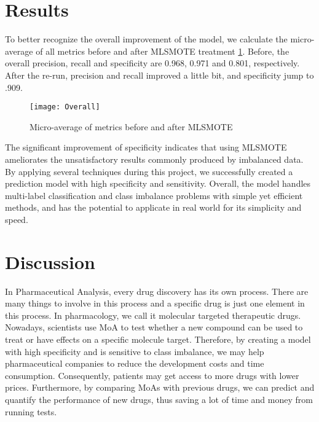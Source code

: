 \documentclass[11.5pt]{article}
\begin{document}
\section{Results}

To better recognize the overall improvement of the model, we calculate the micro-average of all metrics before and after MLSMOTE treatment \ref{fig:ave}. Before, the overall precision, recall and specificity are 0.968, 0.971 and 0.801, respectively. After the re-run, precision and recall improved a little bit, and specificity jump to .909.

\begin{figure}[htb]
  \centering
    \texttt{[image: Overall]}
  \caption{Micro-average of metrics before and after MLSMOTE}\label{fig:ave}
\end{figure}

The significant improvement of specificity indicates that using MLSMOTE ameliorates the unsatisfactory results commonly produced by imbalanced data. By applying several techniques during this project, we successfully created a prediction model with high specificity and sensitivity. Overall, the model handles multi-label classification and class imbalance problems with simple yet efficient methods, and has the potential to applicate in real world for its simplicity and speed.


\section{Discussion}

In Pharmaceutical Analysis, every drug discovery has its own process. There are many things to involve in this process and a specific drug is just one element in this process. In pharmacology, we call it molecular targeted therapeutic drugs. Nowadays, scientists use MoA to test whether a new compound can be used to treat or have effects on a specific molecule target. Therefore, by creating a model with high specificity and is sensitive to class imbalance, we may help pharmaceutical companies to reduce the development costs and time consumption. Consequently, patients may get access to more drugs with lower prices. Furthermore, by comparing MoAs with previous drugs, we can predict and quantify the performance of new drugs, thus saving a lot of time and money from running tests. 
\end{document}
